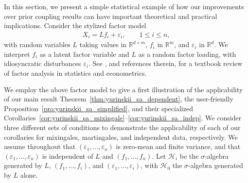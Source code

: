 \documentclass[11pt,lof]{puthesis}
\newcommand{\R}{\ensuremath{\mathbb{R}}}
\newcommand{\cH}{\ensuremath{\mathcal{H}}}
\theoremstyle{break}
\theoremstyle{proof}
\begin{document}
In this section, we present a simple statistical example of how our
improvements over prior coupling results can have important theoretical and
practical implications. Consider the stylized factor model
%
\begin{align*}
X_i = L f_i + \varepsilon_i, \qquad 1 \leq i \leq n,
\end{align*}
%
with random variables $L$ taking values in $\R^{d \times m}$, $f_i$ in $\R^m$,
and $\varepsilon_i$ in $\R^d$. We interpret $f_i$ as a latent factor variable
and $L$ as a random factor loading, with idiosyncratic disturbances
$\varepsilon_i$. See \citet{fan2020statistical}, and references therein, for a
textbook review of factor analysis in statistics and econometrics.

We employ the above factor model to give a first illustration of the
applicability of our main result Theorem~\ref{thm:yurinskii_sa_dependent}, the
user-friendly Proposition~\ref{pro:yurinskii_sa_simplified}, and their
specialized
Corollaries~\ref{cor:yurinskii_sa_mixingale}--\ref{cor:yurinskii_sa_indep}. We
consider three different sets of conditions to demonstrate the applicability of
each of our corollaries for mixingales, martingales, and independent data,
respectively. We assume throughout that
$(\varepsilon_1, \ldots, \varepsilon_n)$ is zero-mean and finite variance, and
that $(\varepsilon_1, \ldots, \varepsilon_n)$ is independent
of $L$ and $(f_1, \ldots, f_n)$. Let $\cH_i$ be the $\sigma$-algebra generated
by $L$, $(f_1, \ldots, f_i)$, and $(\varepsilon_1, \ldots, \varepsilon_i)$, with
$\cH_0$ the $\sigma$-algebra generated by $L$ alone.
\end{document}
